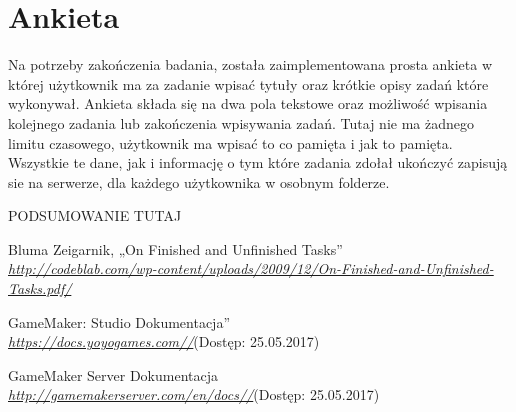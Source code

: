 \documentclass[openright]{xmgr}
\begin{document}
\section{Ankieta}
Na potrzeby zakończenia badania, została zaimplementowana prosta ankieta w której użytkownik ma za zadanie wpisać tytuły oraz krótkie opisy zadań które wykonywał. Ankieta składa się na dwa pola tekstowe oraz możliwość wpisania kolejnego zadania lub zakończenia wpisywania zadań.  Tutaj nie ma żadnego limitu czasowego, użytkownik ma wpisać to co pamięta i jak to pamięta. Wszystkie te dane, jak i informację o tym które zadania zdołał ukończyć zapisują sie na serwerze, dla każdego użytkownika w osobnym folderze.






\summary

PODSUMOWANIE TUTAJ







\begin{thebibliography}{9}

Bluma Zeigarnik, „On Finished and Unfinished Tasks”\\
\textit{\url{http://codeblab.com/wp-content/uploads/2009/12/On-Finished-and-Unfinished-Tasks.pdf/}}

GameMaker: Studio Dokumentacja”\\
\textit{\url{https://docs.yoyogames.com//}}(Dostęp: 25.05.2017)

GameMaker Server Dokumentacja\\
\textit{\url{http://gamemakerserver.com/en/docs//}}(Dostęp: 25.05.2017)

\end{thebibliography}

\listoffigures

\lstlistoflistings 

\oswiadczenie
\end{document}
